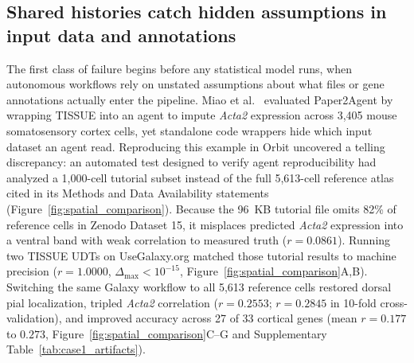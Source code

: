 \documentclass[11pt,letterpaper]{article}
\newcommand{\tool}[1]{\textsf{#1}}
\begin{document}
\subsection{Shared histories catch hidden assumptions in input data and annotations}

The first class of failure begins before any statistical model runs, when autonomous workflows rely on unstated assumptions about what files or gene annotations actually enter the pipeline. Miao et al.\ \cite{miao2026} evaluated \tool{Paper2Agent} by wrapping \tool{TISSUE} \cite{sun2024} into an agent to impute \textit{Acta2} expression across 3,405 mouse somatosensory cortex cells, yet standalone code wrappers hide which input dataset an agent read. Reproducing this example in \tool{Orbit} uncovered a telling discrepancy: an automated test designed to verify agent reproducibility had analyzed a 1,000-cell tutorial subset instead of the full 5,613-cell reference atlas cited in its Methods and Data Availability statements (Figure~\ref{fig:spatial_comparison}). Because the 96~KB tutorial file omits 82\% of reference cells in Zenodo Dataset 15, it misplaces predicted \textit{Acta2} expression into a ventral band with weak correlation to measured truth ($r = 0.0861$). Running two \tool{TISSUE} UDTs on UseGalaxy.org matched those tutorial results to machine precision ($r = 1.0000$, $\Delta_{\max} < 10^{-15}$, Figure~\ref{fig:spatial_comparison}A,B). Switching the same Galaxy workflow to all 5,613 reference cells restored dorsal pial localization, tripled \textit{Acta2} correlation ($r = 0.2553$; $r = 0.2845$ in 10-fold cross-validation), and improved accuracy across 27 of 33 cortical genes (mean $r = 0.177$ to $0.273$, Figure~\ref{fig:spatial_comparison}C--G and Supplementary Table~\ref{tab:case1_artifacts}).
\end{document}
